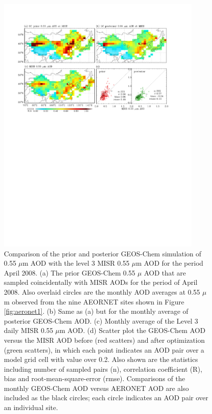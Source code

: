  \begin{figure}[h]
  \centering
  \includegraphics[width={0.9\textwidth}]{figures/a7.pdf}  
  \caption{Comparison of the prior and posterior GEOS-Chem simulation of 0.55 $\mu$m AOD with the level 3 MISR 0.55 $\mu$m AOD for the period April 2008. (a) The prior GEOS-Chem 0.55 $\mu$ AOD that are sampled coincidentally with MISR AODs for the period of April 2008. Also overlaid circles are the monthly AOD averages at 0.55 $\mu$m observed from the nine AEORNET sites shown in Figure \ref{fig:aeronet1}. (b) Same as (a) but for the monthly average of posterior GEOS-Chem AOD. (c) Monthly average of the Level 3 daily MISR 0.55 $\mu$m AOD.  (d) Scatter plot the GEOS-Chem AOD versus the MISR AOD before (red scatters) and after optimization (green scatters), in which each point indicates an AOD pair over a model grid cell with value over 0.2. Also shown are the statistics including number of sampled pairs (n), correlation coefficient (R), bias and root-mean-square-error (rmse). Comparisons of the monthly GEOS-Chem AOD versus AERONET AOD are also included as the black circles; each circle indicates an AOD pair over an individual site.}
  \label{fig:misr1}
 \end{figure}

